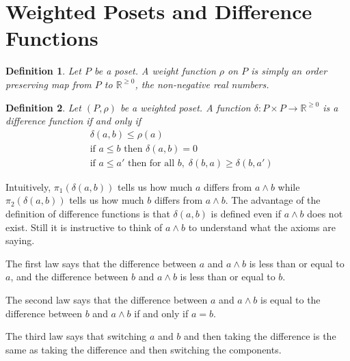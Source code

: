 \documentclass[acmsmall,review,anonymous]{acmart}\settopmatter{printfolios=true,printccs=false,printacmref=false}
\newtheorem{definition}{Definition}
\begin{document}
\iffalse
\section{Weighted Posets and Difference Functions}
\begin{definition}
Let $P$ be a poset. A weight function $\rho$ on $P$ is simply an order
preserving map from $P$ to $\mathbb{R}^{\geq 0}$, the non-negative real
numbers.
\end{definition}

\begin{definition}
Let $(P, \rho)$ be a weighted poset. A function $\delta : P
\times P \longrightarrow \mathbb{R}^{\geq 0}$ is a difference function if and
only if
\begin{align*}
&\delta(a, b) \leq \rho(a) \tag{A1}\\
&\text{if } a \leq b \text{ then } \delta(a, b) = 0 \tag{A2}\\
&\text{if } a \leq a' \text{ then for all }b , \; \delta(b, a) \geq \delta(b,
a')\tag{A3}
\end{align*}
\end{definition}
\iffalse
Intuitively, $\pi_1(\delta(a, b))$ tells us how much $a$ differs from $a \wedge
b$ while $\pi_2(\delta(a, b))$ tells us how much $b$ differs from $a \wedge b$.
The advantage of the definition of difference functions is that $\delta(a, b)$
is defined even if $a \wedge b$ does not exist. Still it is instructive to
think of $a \wedge b$ to understand what the axioms are saying.

The first law says that the difference between $a$ and $a \wedge b$ is less
than or equal to $a$, and the difference between $b$ and $a \wedge b$
is less than or equal to $b$.

The second law says that the difference between $a$ and $a \wedge b$ is equal
to the difference between $b$ and $a \wedge b$ if and only if $a = b$.

The third law says that switching $a$ and $b$ and then taking the difference
is the same as taking the difference and then switching the components.
\end{document}
